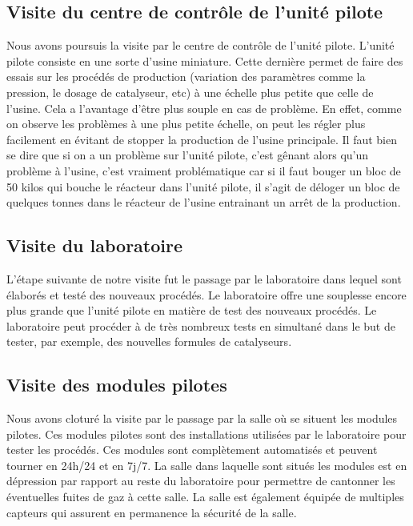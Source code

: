 \documentclass[12pt]{amsart}
\begin{document}
\subsection{Visite du centre de contrôle de l'unité pilote}

Nous avons poursuis la visite par le centre de contrôle de l'unité pilote. L'unité pilote consiste en une sorte d'usine miniature. Cette dernière permet de faire des essais sur les procédés de production (variation des paramètres comme la pression, le dosage de catalyseur, etc) à une échelle plus petite que celle de l'usine. Cela a l'avantage d'être plus souple en cas de problème. En effet, comme on observe les problèmes à une plus petite échelle, on peut les régler plus facilement en évitant de stopper la production de l'usine principale. Il faut bien se dire que si on a un problème sur l'unité pilote, c'est gênant alors qu'un problème à l'usine, c'est vraiment problématique car si il faut bouger un bloc de 50 kilos qui bouche le réacteur dans l'unité pilote, il s'agit de déloger un  bloc de quelques tonnes dans le réacteur de l'usine entrainant un arrêt de la production.

\subsection{Visite du laboratoire}

L'étape suivante de notre visite fut le passage par le laboratoire dans lequel sont élaborés et testé des nouveaux procédés. Le laboratoire offre une souplesse encore plus grande que l'unité pilote en matière de test des nouveaux procédés. Le laboratoire peut procéder à de très nombreux tests en simultané dans le but de tester, par exemple, des nouvelles formules de catalyseurs. 

\subsection{Visite des modules pilotes}

Nous avons cloturé la visite par le passage par la salle où se situent les modules pilotes. Ces modules pilotes sont des installations utilisées par le laboratoire pour tester les procédés. Ces modules sont complètement automatisés et peuvent tourner en 24h/24 et en 7j/7. La salle dans laquelle sont situés les modules est en dépression par rapport au reste du laboratoire pour permettre de cantonner les éventuelles fuites de gaz à cette salle. La salle est également équipée de multiples capteurs qui assurent en permanence la sécurité de la salle.
\end{document}
